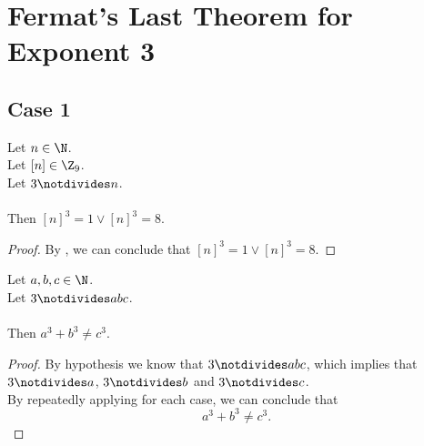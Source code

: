 
\chapter{Fermat's Last Theorem for Exponent 3}
\label{chap:flt3}

\section{Case 1}


\begin{lemma}
  \label{lmm:cube_of_not_dvd}
  \leanok
  Let $n \in \N$. \\
  Let $\left[n \right] \in \Z_9$. \\
  Let $3 \notdivides n$. \\ \\
  Then $\left[n \right]^3 = 1 \lor \left[n \right]^3 = 8$.
\end{lemma}
\begin{proof}
  \leanok
  By , we can conclude that $\left[n \right]^3 = 1 \lor \left[n \right]^3 = 8$.
\end{proof}

\begin{theorem}
    \label{thm:fermatLastTheoremThree_case_1}
    \leanok
    Let $a, b, c \in \N$. \\
    Let $3 \notdivides abc$. \\\\
    Then $a ^ 3 + b ^ 3 \neq c ^ 3$.
\end{theorem}
\begin{proof}
  \leanok
  By hypothesis we know that $3 \notdivides abc$, which implies that $3 \notdivides a$, $3 \notdivides b$ and $3 \notdivides c$. \\
  By repeatedly applying  for each case,
  we can conclude that $$a ^ 3 + b ^ 3 \neq c ^ 3.$$
\end{proof}

